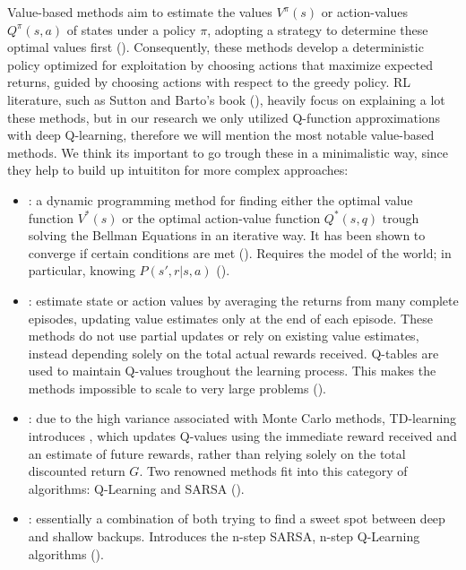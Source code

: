 \noindent Value-based methods aim to estimate the values $V^{\pi}(s)$ or action-values $Q^{\pi}(s, a)$ of states under a policy $\pi$, adopting a strategy to determine these optimal values first (\textcolor{deepblue}{\cite{SpinningUp2018}}). Consequently, these methods develop a deterministic policy optimized for exploitation by choosing actions that maximize expected returns, guided by choosing actions with respect to the greedy policy. RL literature, such as Sutton and Barto's book (\cite{Sutton1998}), heavily focus on explaining a lot these methods, but in our research we only utilized Q-function approximations with deep Q-learning, therefore we will mention the most notable value-based methods. We think its important to go trough these in a minimalistic way, since they help to build up intuititon for more complex approaches:

\vspace{-2pt}

\begin{itemize}[itemsep=1pt, parsep=0pt]
    \item {}: a dynamic programming method for finding either the optimal value function $V^{*}(s)$ or the optimal action-value function $Q^{*}(s, q)$ trough solving the Bellman Equations in an iterative way. It has been shown to converge if certain conditions are met  (\cite{dellavecchia}). Requires the model of the world; in particular, knowing $P(s', r | s, a)$ (\cite{Sutton1998}).

    \item {}: estimate state or action values by averaging the returns from many complete episodes, updating value estimates only at the end of each episode. These methods do not use partial updates or rely on existing value estimates, instead depending solely on the total actual rewards received. Q-tables are used to maintain Q-values troughout the learning process. This makes the methods impossible to scale to very large problems (\cite{Sutton1998}).

    \item {}: due to the high variance associated with Monte Carlo methods, TD-learning introduces , which updates Q-values using the immediate reward received and an estimate of future rewards, rather than relying solely on the total discounted return $G$. Two renowned methods fit into this category of algorithms: Q-Learning and SARSA (\cite{Sutton1998}).

    \item {}: essentially a combination of both trying to find a sweet spot between deep and shallow backups. Introduces the n-step SARSA, n-step Q-Learning algorithms (\cite{Sutton1998}).

\end{itemize}

